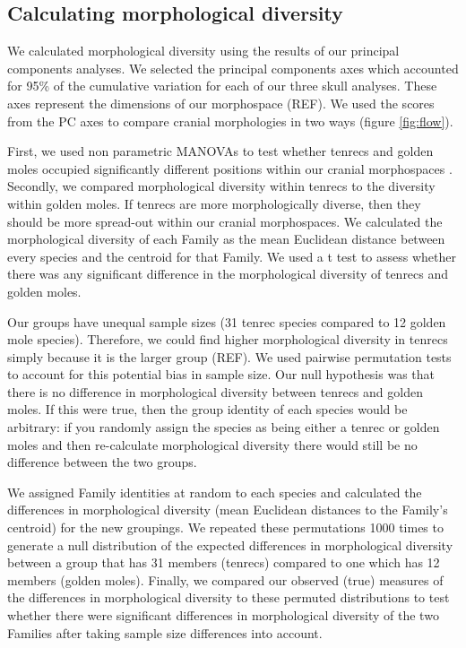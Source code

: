\documentclass[12pt,a4paper]{article}
\begin{document}
	
\subsection{Calculating morphological diversity}

	We calculated morphological diversity using the results of our principal components analyses. We selected the principal components axes which accounted for 95\% of the cumulative variation for each of our three skull analyses. These axes represent the dimensions of our morphospace (REF). We used the scores from the PC axes to compare cranial morphologies in two ways (figure \ref{fig:flow}).
	
	First, we used non parametric MANOVAs \citep{Anderson2001} to test whether tenrecs and golden moles occupied significantly different positions within our cranial morphospaces \citep[e.g][]{Serb2011, Ruta2013}.
	Secondly, we compared morphological diversity within tenrecs to the diversity within golden moles. If tenrecs are more morphologically diverse, then they should be more spread-out within our cranial morphospaces. We calculated the morphological diversity of each Family as the mean Euclidean distance between every species and the centroid for that Family. We used a t test to assess whether there was any significant difference in the morphological diversity of tenrecs and golden moles.
	
	Our groups have unequal sample sizes (31 tenrec species compared to 12 golden mole species). Therefore, we could find higher morphological diversity in tenrecs simply because it is the larger group (REF). We used pairwise permutation tests to account for this potential bias in sample size. Our null hypothesis was that there is no difference in morphological diversity between tenrecs and golden moles. If this were true, then the group identity of each species would be arbitrary: if you randomly assign the species as being either a tenrec or golden moles and then re-calculate morphological diversity there would still be no difference between the two groups. 
	
	We assigned Family identities at random to each species and calculated the differences in morphological diversity (mean Euclidean distances to the Family's centroid) for the new groupings. We repeated these permutations 1000 times to generate a null distribution of the expected differences in morphological diversity between a group that has 31 members (tenrecs) compared to one which has 12 members (golden moles). Finally, we compared our observed (true) measures of the differences in morphological diversity to these permuted distributions to test whether there were significant differences in morphological diversity of the two Families after taking sample size differences into account.
	
\end{document}
